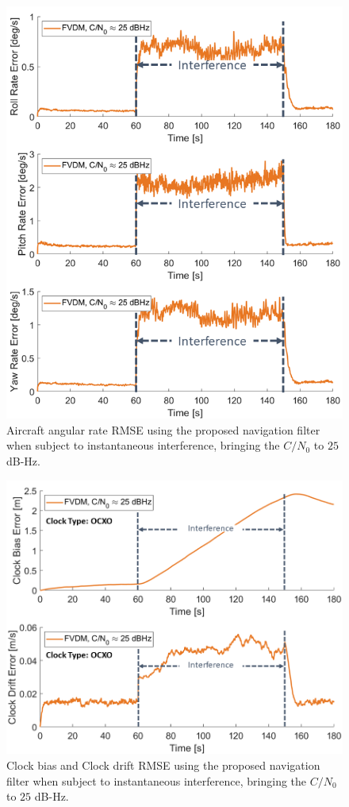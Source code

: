 \documentclass[12pt]{report}
\begin{document}
\begin{figure}[!ht]
  \centering
  \includegraphics[width=0.75\linewidth]{Figures/Results/trajectoryfigure/Slide10.PNG}
  \caption{Aircraft angular rate RMSE using the proposed navigation filter when subject to instantaneous interference, bringing the \(C/N_0\) to \(25\) dB-Hz.}\label{fig:Ang25}
\end{figure}


\begin{figure}[!ht]
  \centering
  \includegraphics[width=0.75\linewidth]{Figures/Results/trajectoryfigure/Slide22.PNG}
  \caption{Clock bias and Clock drift RMSE using the proposed navigation filter when subject to instantaneous interference, bringing the \(C/N_0\) to \(25\) dB-Hz.}\label{fig:Clk25}
\end{figure}
\end{document}
